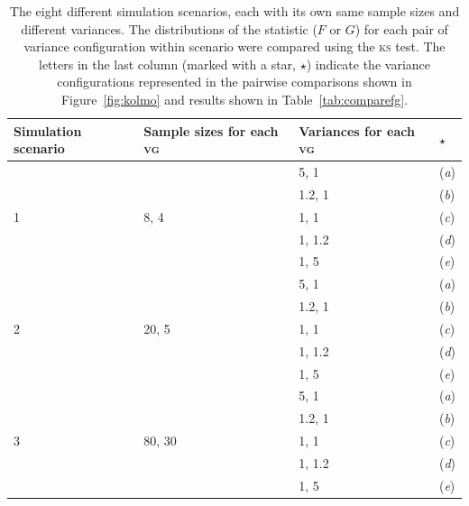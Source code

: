 \begin{table}[!p]
\caption[Summary of simulation scenarios.]{The eight different simulation scenarios, each with its own same sample sizes and different variances. The distributions of the statistic ($F$ or $G$) for each pair of variance configuration within scenario were compared using the \textsc{ks} test. The letters in the last column (marked with a star, $\star$) indicate the variance configurations represented in the pairwise comparisons shown in Figure~\ref{fig:kolmo} and results shown in Table~\ref{tab:comparefg}.}
\begin{center}
{\small
\begin{tabular}{@{}m{20mm}<{\raggedright}m{28mm}<{\raggedright}m{23mm}<{\raggedright}m{10mm}<{\centering}@{}}
\toprule
Simulation scenario & Sample sizes for each \textsc{vg} & Variances for each \textsc{vg} & $\star$\\
\midrule
\multirow{5}{*}{1} & \multirow{5}{*}{8, 4}   & 5, 1   & (\emph{a}) \\
{}                 & {}                      & 1.2, 1 & (\emph{b}) \\
{}                 & {}                      & 1, 1   & (\emph{c}) \\
{}                 & {}                      & 1, 1.2 & (\emph{d}) \\
{}                 & {}                      & 1, 5   & (\emph{e}) \\
\midrule
\multirow{5}{*}{2} & \multirow{5}{*}{20, 5}  & 5, 1   & (\emph{a}) \\
{}                 & {}                      & 1.2, 1 & (\emph{b}) \\
{}                 & {}                      & 1, 1   & (\emph{c}) \\
{}                 & {}                      & 1, 1.2 & (\emph{d}) \\
{}                 & {}                      & 1, 5   & (\emph{e}) \\
\midrule
\multirow{5}{*}{3} & \multirow{5}{*}{80, 30} & 5, 1   & (\emph{a}) \\
{}                 & {}                      & 1.2, 1 & (\emph{b}) \\
{}                 & {}                      & 1, 1   & (\emph{c}) \\
{}                 & {}                      & 1, 1.2 & (\emph{d}) \\
{}                 & {}                      & 1, 5   & (\emph{e}) \\

\end{tabular}}
\end{center}
\end{table}
